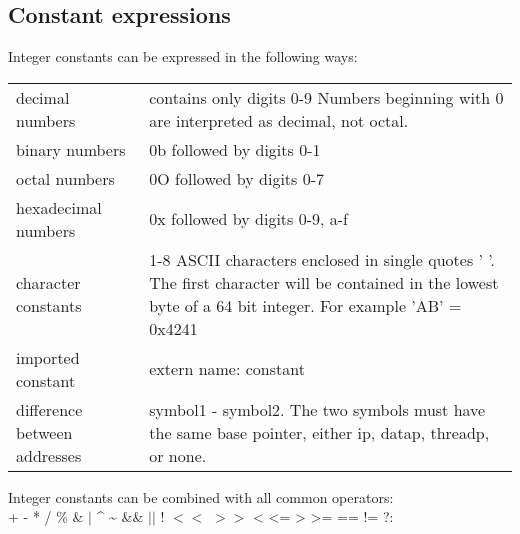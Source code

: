 \documentclass[forwardcom.tex]{subfiles}
\begin{document}
\subsection{Constant expressions} \label{assemblyConstantExpressions}
Integer constants can be expressed in the following ways:

\begin{tabular}{|p{47mm}p{115mm}|}
\hline
decimal numbers & contains only digits 0-9 \newline Numbers beginning with 0 are interpreted as decimal, not octal. \\
binary numbers & 0b followed by digits 0-1\\
octal numbers & 0O followed by digits 0-7\\
hexadecimal numbers & 0x followed by digits 0-9, a-f\\
character constants & 1-8 ASCII characters enclosed in single quotes '{ }'. The first character will be contained in the lowest byte of a 64 bit integer. For example 'AB' = 0x4241 \\
imported constant & extern name: constant \\
difference between addresses & symbol1 - symbol2. The two symbols must have the same base pointer, either ip, datap, threadp, or none. \\
\hline
\end{tabular}
\vv

Integer constants can be combined with all common operators: \\
+ \hspace{2mm} - \hspace{2mm} * \hspace{2mm} / \hspace{2mm} \% \hspace{2mm} \& \hspace{2mm} $\vert$ \hspace{2mm} \^{} \hspace{2mm} \textasciitilde \hspace{2mm}
 \&\& \hspace{2mm} $\vert\vert$ \hspace{2mm} ! \hspace{2mm}
$<<$ \hspace{2mm} $>>$ \hspace{2mm}  
\textless \hspace{2mm} \textless= \hspace{2mm} \textgreater \hspace{2mm} \textgreater= \hspace{2mm} 
 == \hspace{2mm} != \hspace{2mm} ?: 
\vv
\end{document}
